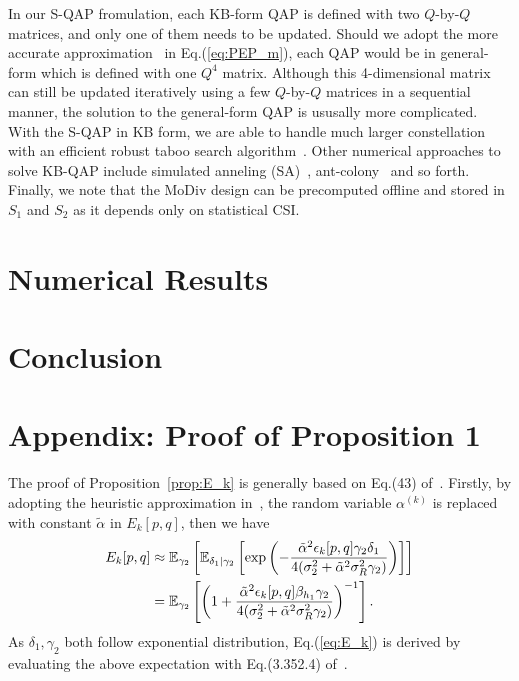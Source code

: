 \documentclass{article}
\begin{document}
In our S-QAP fromulation, each KB-form QAP is defined with two $Q$-by-$Q$
matrices, and only one of them needs to be updated. Should we adopt the more
accurate approximation~\cite{chiani2003new} in Eq.(\ref{eq:PEP_m}), each QAP
would be in general-form which is defined with one $Q^4$ matrix. Although this
4-dimensional matrix can still be updated iteratively using a few
$Q$-by-$Q$ matrices in a sequential manner, the solution to the general-form QAP
is ususally more complicated. With the S-QAP in KB form, we are able
to handle much larger constellation with an efficient robust taboo search
algorithm~\cite{taillard1991robust}. Other numerical approaches to
solve KB-QAP include simulated anneling (SA)~\cite{connolly1990improved},
ant-colony~\cite{gambardella1999ant} and so forth. Finally, we note that the
MoDiv design can be precomputed offline and stored in $S_1$ and $S_2$ as it
depends only on statistical CSI.

\section{Numerical Results}
\label{sec:numerical}
 
 
 

\section{Conclusion}
\label{sec:conclusion}

\section{Appendix: Proof of Proposition 1}
\label{sec:append}
The proof of Proposition~\ref{prop:E_k} is generally based on Eq.(43)
of~\cite{han2009performance}. Firstly, by adopting the heuristic approximation
in~\cite{jing2006distributed}, the random variable $\alpha^{(k)}$ is replaced
with constant $\tilde{\alpha}$ in $E_k[p, q]$, then we have
\begin{align}
  E_k[p, q] & \approx \mathbb{E}_{\gamma_2}
  \left[
  \mathbb{E}_{\delta_1|\gamma_2}
  \left[
  \exp\left(
  -\frac{\tilde{\alpha}^2\epsilon_k[p,q]\gamma_2 \delta_1}
  {4(\sigma_2^2+\tilde{\alpha}^2\sigma_R^2\gamma_2)}
  \right)
  \right]
  \right] \notag \\
  & = \mathbb{E}_{\gamma_2}
  \left[
  \left(1 + \frac{\tilde{\alpha}^2\epsilon_k[p,q]\beta_{h_1}\gamma_2 }
  {4(\sigma_2^2+\tilde{\alpha}^2\sigma_R^2\gamma_2)}\right)^{-1}
  \right].
\end{align}
As $\delta_1,\gamma_2$ both follow exponential distribution,
Eq.(\ref{eq:E_k}) is derived by evaluating the above expectation with Eq.(3.352.4)
of~\cite{zwillinger2014table}.
\end{document}
